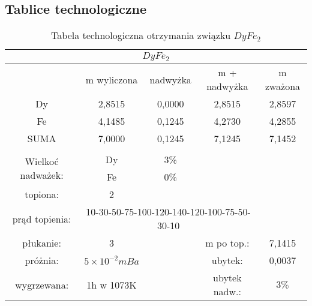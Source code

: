 \documentclass[a4paper,12pt]{article}
\numberwithin{equation}{section}
\begin{document}
\begin{appendices}
\renewcommand{\thetable}{\Alph{section}.\arabic{table}}


\section{Tablice technologiczne}


\begin{table}[!ht]
\footnotesize
\caption{Tabela technologiczna otrzymania związku $DyFe_{2}$ }
\label{Dytechno}
\begin{tabular}{|c|c|c|c|c|}
\hline
\multicolumn{5}{|c|}{$DyFe_{2} $}\\\hline\hline
	& m wyliczona		&	nadwyżka	& m + nadwyżka	&	m zważona \\\hline
Dy	&	2,8515	&	0,0000	&	2,8515	&	2,8597	\\\hline
Fe	&	4,1485	&	0,1245	&	4,2730	&	4,2855	\\\hline
SUMA	&	7,0000	&	0,1245	&	7,1245	&	7,1452	\\\hline
\multicolumn{5}{|c|}{}\\\cline{1-3}
\multirow{2}{*}{Wielkoć nadważek:}	
	&	Dy 	&	3\%	& 	\multicolumn{2}{c|}{}\\\cline{2-3}	
	&	Fe	&	0\%	&	\multicolumn{2}{c|}{}\\\cline{1-3}
\multicolumn{1}{|c}{topiona:}	&	\multicolumn{1}{c|}{2} 	&	\multicolumn{3}{c|}{}\\\cline{1-4}
\multicolumn{1}{|c}{prąd topienia:}	&	\multicolumn{3}{c|}{10-30-50-75-100-120-140-120-100-75-50-30-10}	&	\\\cline{1-5}
\multicolumn{1}{|c}{płukanie:}	&	\multicolumn{1}{c|}{3}	&	&	\multicolumn{1}{c}{m po top.:}	&	\multicolumn{1}{c|}{7,1415} 	 	\\\cline{1-2}\cline{4-5}
\multicolumn{1}{|c}{próżnia:}	&	\multicolumn{1}{c|}{$5\times10^{-2}mBa$}	&	&	\multicolumn{1}{c}{ubytek:}	&	\multicolumn{1}{c|}{0,0037} 	 	\\\cline{1-2}\cline{4-5}
\multicolumn{1}{|c}{wygrzewana:}	&	\multicolumn{1}{c|}{1h w 1073K }	&	&	\multicolumn{1}{c}{ubytek nadw.:}	&	\multicolumn{1}{c|}{$3\%$} 	 	\\\hline
\end{tabular}
\end{table}


\end{appendices}
\end{document}
